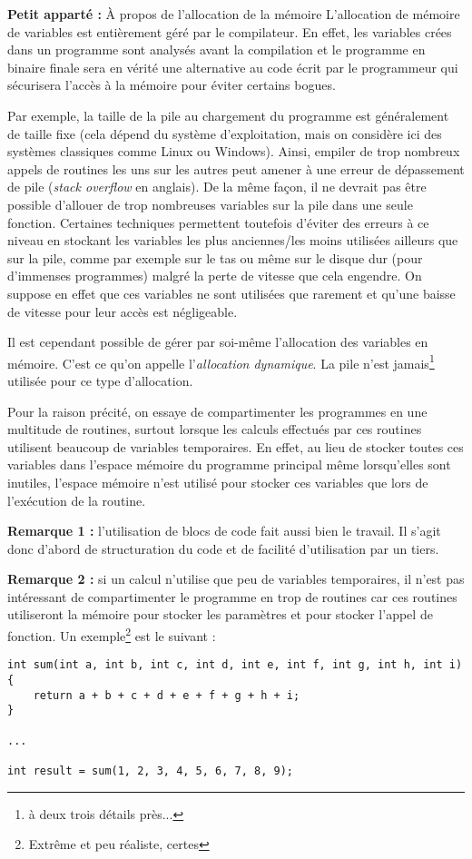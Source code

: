 \documentclass[../../../main.tex]{subfiles}
\begin{document}
\begin{minitelbasicbox}{\textbf{Petit apparté :} À propos de l'allocation de la mémoire}
	L'allocation de mémoire de variables est entièrement géré par le compilateur. En effet, les variables crées dans un programme sont analysés avant la compilation et le programme en binaire finale sera en vérité une alternative au code écrit par le programmeur qui sécurisera l'accès à la mémoire pour éviter certains bogues.
 
	Par exemple, la taille de la pile au chargement du programme est généralement de taille fixe (cela dépend du système d'exploitation, mais on considère ici des systèmes classiques comme Linux ou Windows). Ainsi, empiler de trop nombreux appels de routines les uns sur les autres peut amener à une erreur de dépassement de pile (\textit{stack overflow} en anglais). De la même façon, il ne devrait pas être possible d'allouer de trop nombreuses variables sur la pile dans une seule fonction. Certaines techniques permettent toutefois d'éviter des erreurs à ce niveau en stockant les variables les plus anciennes/les moins utilisées ailleurs que sur la pile, comme par exemple sur le tas ou même sur le disque dur (pour d'immenses programmes) malgré la perte de vitesse que cela engendre. On suppose en effet que ces variables ne sont utilisées que rarement et qu'une baisse de vitesse pour leur accès est négligeable.

	Il est cependant possible de gérer par soi-même l'allocation des variables en mémoire. C'est ce qu'on appelle l'\textit{allocation dynamique}. La pile n'est jamais\footnote{à deux trois détails près...} utilisée pour ce type d'allocation.
\end{minitelbasicbox}

Pour la raison précité, on essaye de compartimenter les programmes en une multitude de routines, surtout lorsque les calculs effectués par ces routines utilisent beaucoup de variables temporaires. En effet, au lieu de stocker toutes ces variables dans l'espace mémoire du programme principal même lorsqu'elles sont inutiles, l'espace mémoire n'est utilisé pour stocker ces variables que lors de l'exécution de la routine.

\textbf{Remarque 1 :} l'utilisation de blocs de code fait aussi bien le travail. Il s'agit donc d'abord de structuration du code et de facilité d'utilisation par un tiers.

\textbf{Remarque 2 :} si un calcul n'utilise que peu de variables temporaires, il n'est pas intéressant de compartimenter le programme en trop de routines car ces routines utiliseront la mémoire pour stocker les paramètres et pour stocker l'appel de fonction. Un exemple\footnote{Extrême et peu réaliste, certes} est le suivant :
\begin{verbatim}
int sum(int a, int b, int c, int d, int e, int f, int g, int h, int i) {
	return a + b + c + d + e + f + g + h + i;
}

...

int result = sum(1, 2, 3, 4, 5, 6, 7, 8, 9);
\end{verbatim}
\end{document}
